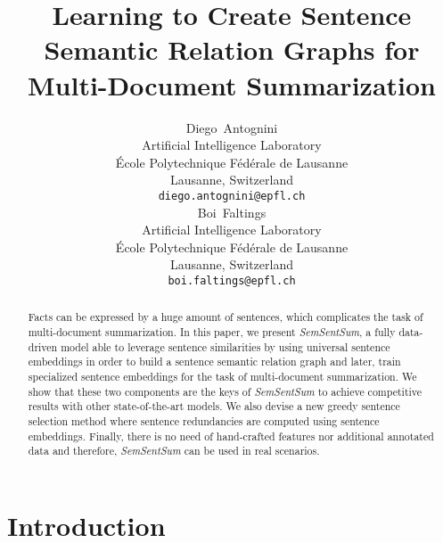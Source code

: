 \documentclass{article}
\title{Learning to Create Sentence Semantic Relation Graphs for Multi-Document Summarization}
\author{
  Diego~Antognini\\
  Artificial Intelligence Laboratory\\
  École Polytechnique Fédérale de Lausanne\\
  Lausanne, Switzerland\\
  \texttt{diego.antognini@epfl.ch} \\
   \And
  Boi~Faltings\\
  Artificial Intelligence Laboratory\\
  École Polytechnique Fédérale de Lausanne\\
  Lausanne, Switzerland\\
  \texttt{boi.faltings@epfl.ch} \\
}
\begin{document}
\maketitle

\begin{abstract}
Facts can be expressed by a huge amount of sentences, which complicates the task of multi-document summarization. In this paper, we present \textit{SemSentSum}, a fully data-driven model able to leverage sentence similarities by using universal sentence embeddings in order to build a sentence semantic relation graph and later, train specialized sentence embeddings for the task of multi-document summarization. We show that these two components are the keys of \textit{SemSentSum} to achieve competitive results with other state-of-the-art models. We also devise a new greedy sentence selection method where sentence redundancies are computed using sentence embeddings. Finally, there is no need of hand-crafted features nor additional annotated data and therefore, \textit{SemSentSum} can be used in real scenarios.

\end{abstract}

\section{Introduction}



\end{document}

